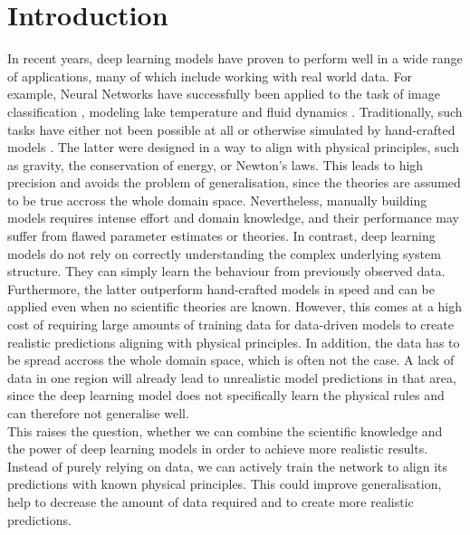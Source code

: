 \label{section:introduction}
\section{Introduction}

In recent years, deep learning models have proven to perform well in a wide range of applications, many of which include working with real world data. For example, Neural Networks have successfully been applied to the task of image classification \cite{NIPS2012_4824}, modeling lake temperature \cite{DBLP:journals/corr/abs-1710-11431} and fluid dynamics \cite{DBLP:journals/corr/SinghMD16}. Traditionally, such tasks have either not been possible at all or otherwise simulated by hand-crafted models \cite{Cursi2005PhysicallyCN}. The latter were designed in a way to align with physical principles, such as gravity, the conservation of energy, or Newton's laws. This leads to high precision and avoids the problem of generalisation, since the theories are assumed to be true accross the whole domain space. Nevertheless, manually building models requires intense effort and domain knowledge, and their performance may suffer from flawed parameter estimates or theories. In contrast, deep learning models do not rely on correctly understanding the complex underlying system structure. They can simply learn the behaviour from previously observed data. Furthermore, the latter outperform hand-crafted models in speed and can be applied even when no scientific theories are known. However, this comes at a high cost of requiring large amounts of training data for data-driven models to create realistic predictions aligning with physical principles. In addition, the data has to be spread accross the whole domain space, which is often not the case. A lack of data in one region will already lead to unrealistic model predictions in that area, since the deep learning model does not specifically learn the physical rules and can therefore not generalise well.\\
\indent This raises the question, whether we can combine the scientific knowledge and the power of deep learning models in order to achieve more realistic results. Instead of purely relying on data, we can actively train the network to align its predictions with known physical principles. This could improve generalisation, help to decrease the amount of data required and to create more realistic predictions.\\


\clearpage

